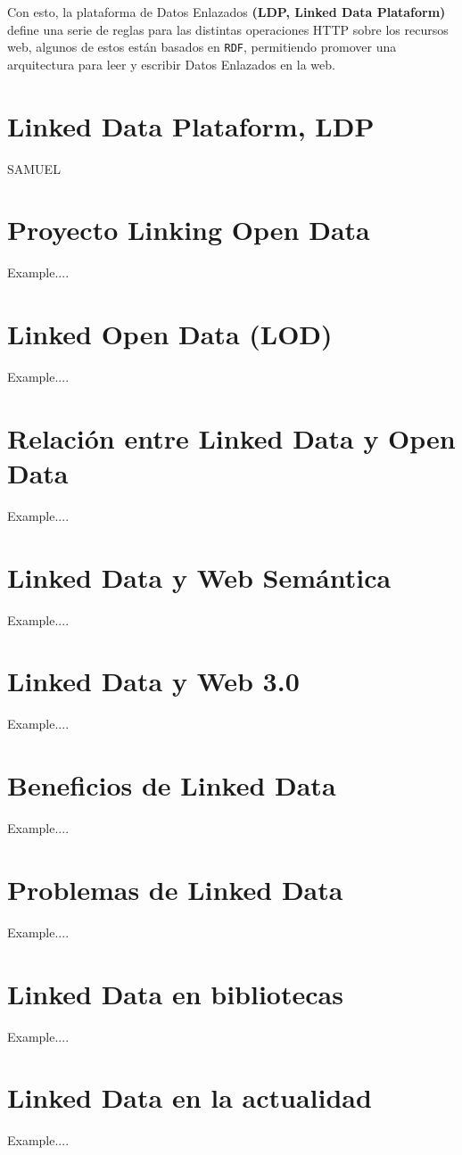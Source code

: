\documentclass[11pt]{report}
\begin{document}
Con esto, la plataforma de Datos Enlazados \textbf{(LDP, Linked Data Plataform)} define una serie de reglas para las distintas operaciones HTTP sobre los recursos web, algunos de estos están basados en \texttt{RDF}, permitiendo promover una arquitectura para leer y escribir Datos Enlazados en la web.

\chapter{Linked Data Plataform, LDP}
SAMUEL

\chapter{Proyecto Linking Open Data}
Example....

\chapter{Linked Open Data (LOD)}
Example....

\chapter{Relación entre Linked Data y Open Data}
Example....

\chapter{Linked Data y Web Semántica}
Example....

\chapter{Linked Data y Web 3.0}
Example....

\chapter{Beneficios de Linked Data}
Example....

\chapter{Problemas de Linked Data}
Example....

\chapter{Linked Data en bibliotecas}
Example....

\chapter{Linked Data en la actualidad}
Example....
\end{document}
